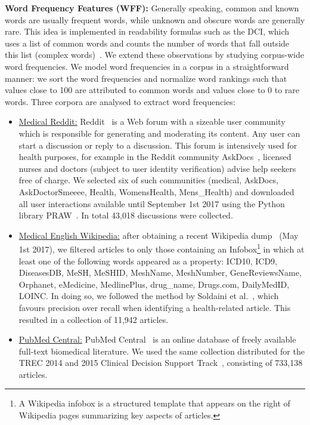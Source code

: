 \textbf{Word Frequency Features (WFF):}
Generally speaking, common and known words are usually frequent words, while unknown and obscure words are generally rare. This idea is implemented in readability formulas such as the DCI, which uses a list of common words and counts the number of words that fall outside this list (complex words)~\cite{dale48}.
We extend these observations by studying corpus-wide word frequencies. 
We model word frequencies in a corpus in a straightforward manner: we sort the word frequencies and normalize word rankings such that values close to 100 are attributed to common words and values close to 0 to rare words. Three corpora are analysed to extract word frequencies:

\begin{itemize}[leftmargin=*]
\item \underline{Medical Reddit:} Reddit~\cite{reddit} is a Web forum with a sizeable user community which is responsible for generating and moderating its content. Any user can start a discussion or reply to a discussion. This forum is intensively used for health purposes, for example in the Reddit community AskDocs~\cite{redditaskdocs}, licensed nurses and doctors (subject to user identity verification) advise help seekers free of charge. We selected six of such communities
    (medical, AskDocs, AskDoctorSmeeee, Health, WomensHealth, Mens\_Health) and downloaded all user interactions available until September 1st 2017 using the Python library PRAW~\cite{redditapi}. In total 43,018 discussions were collected.

\item \underline{Medical English Wikipedia:} after obtaining a recent  Wikipedia dump~\cite{wikipedia} (May 1st 2017), we filtered articles to only those  containing an Infobox\footnote{A Wikipedia infobox is a structured template that appears on the right of Wikipedia pages summarizing key aspects of articles.} in which at least one of the following words appeared as a property: ICD10, ICD9, DiseasesDB, MeSH, MeSHID, MeshName, MeshNumber, GeneReviewsName, Orphanet, eMedicine, MedlinePlus, drug\_name, Drugs.com, DailyMedID, LOINC.
In doing so, we followed the method by Soldaini et al.~\cite{soldaini15}, which favours precision over recall when identifying a health-related article. This resulted in a collection of 11,942 articles. 

\item \underline{PubMed Central:} PubMed Central~\cite{pubmed} is an online  database of freely available full-text biomedical literature. We used the same collection distributed for the TREC 2014 and 2015 Clinical Decision Support Track~\cite{roberts16,trec15}, consisting of 733,138 articles. 
 
\end{itemize}

